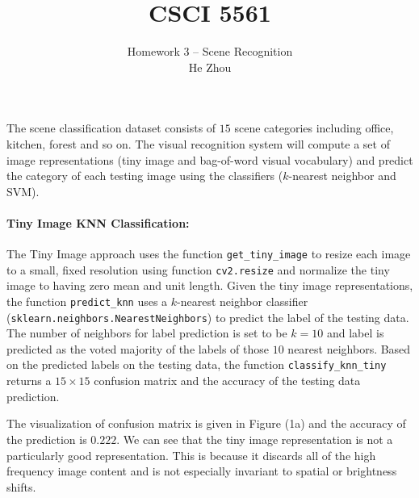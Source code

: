 \documentclass[11pt]{scrartcl}
\begin{document}
\title{CSCI 5561}
\author{\Large Homework 3 -- Scene Recognition\\
	He Zhou}  %
\maketitle

The scene classification dataset consists of $15$ scene categories including office, kitchen, forest and so on. The visual recognition system will compute a set of image representations (tiny image and bag-of-word visual vocabulary) and predict the category of each testing image using the classifiers ($k$-nearest neighbor and SVM).


\paragraph{\textbf{Tiny Image KNN Classification:}}
The Tiny Image approach uses the function \texttt{get\_tiny\_image} to resize each image to a small, fixed resolution using function \texttt{cv2.resize} and normalize the tiny image to having zero mean and unit length. Given the tiny image representations, the function \texttt{predict\_knn} uses a $k$-nearest neighbor classifier (\texttt{sklearn.neighbors.NearestNeighbors}) to predict the label of the testing data. The number of neighbors for label prediction  is set to be $k=10$ and label is predicted as the voted majority of the labels of those $10$ nearest  neighbors. Based on the predicted labels on the testing data, the function \texttt{classify\_knn\_tiny} returns a $15\times 15$ confusion matrix and the accuracy of the testing data prediction.

The visualization of confusion matrix is given in Figure (1a) and the accuracy of the prediction is  $0.222$. We can see that the tiny image representation is not a particularly good representation. This is because it discards all of the high frequency image content and is not especially invariant to spatial or brightness shifts. 
\end{document}
